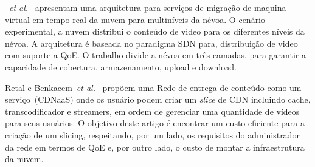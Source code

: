 

 ~\textit{et al.}~\cite{rosarioSENSORS2018} apresentam uma arquitetura para serviços de migração de maquina virtual em tempo real da nuvem para multiníveis da névoa. O cenário experimental, a nuvem distribui o conteúdo de video para os diferentes níveis da névoa. A arquitetura é baseada no paradigma SDN para, distribuição de video com suporte a QoE. O trabalho divide a névoa em três camadas, para garantir a capacidade de cobertura, armazenamento, upload e download.

Retal e Benkacem~\textit{et al.}~\cite{taleb:JSAC18, retalICC2017} propõem uma Rede de entrega de conteúdo como um serviço~(CDNaaS) onde os usuário podem criar um \textit{slice} de CDN incluindo cache, transcodificador e streamers, em ordem de gerenciar uma quantidade de vídeos para seus usuários.%
O objetivo deste artigo é encontrar um custo eficiente para a criação de um slicing, respeitando, por um lado, os requisitos do administrador da rede em termos de QoE e, por outro lado, o custo de montar a infraestrutura da nuvem.%


